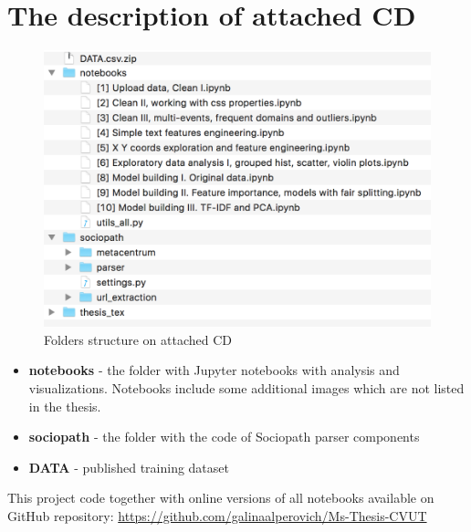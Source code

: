 \chapter*{The description of attached CD}
\label{chap:cd}

\begin{figure}[h]
\begin{center}
\includegraphics[width=.6\textwidth]{structure}
\caption{Folders structure on attached CD}
\label{fig:cdstructure}
\end{center}
\end{figure}

\begin{itemize}
    \item \textbf{notebooks} - the folder with Jupyter notebooks with analysis and visualizations. Notebooks include some additional images which are not listed in the thesis.
    \item \textbf{sociopath} - the folder with the code of Sociopath parser components
    \item \textbf{DATA} - published training dataset
\end{itemize}


This project code together with online versions of all notebooks available on GitHub repository: \url{https://github.com/galinaalperovich/Ms-Thesis-CVUT}